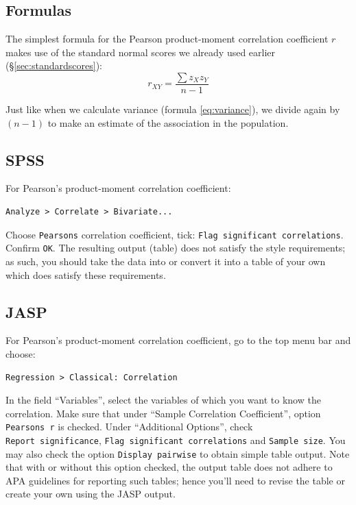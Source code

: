 \documentclass[
]{book}
\begin{document}
\hypertarget{formulas-3}{%
\subsection{Formulas}\label{formulas-3}}

The simplest formula for the Pearson product-moment correlation coefficient
\(r\) makes use of the standard normal scores we already used earlier
(§\ref{sec:standardscores}):
\begin{equation}
    r_{XY} = \frac{\sum z_X z_Y}{n-1}
  \label{eq:pearson}
\end{equation}

Just like when we calculate variance
(formula \eqref{eq:variance}), we divide again by
\((n-1)\) to make an estimate of the association in the population.

\hypertarget{spss-5}{%
\subsection{SPSS}\label{spss-5}}

For Pearson's product-moment correlation coefficient:

\begin{verbatim}
Analyze > Correlate > Bivariate...
\end{verbatim}

Choose \texttt{Pearsons} correlation coefficient, tick:
\texttt{Flag\ significant\ correlations}. Confirm \texttt{OK}. The resulting
output (table) does not satisfy the style requirements; as such, you should
take the data into or convert it into a table of your own which does satisfy these requirements.

\hypertarget{jasp-6}{%
\subsection{JASP}\label{jasp-6}}

For Pearson's product-moment correlation coefficient, go to the top menu bar and choose:

\begin{verbatim}
Regression > Classical: Correlation
\end{verbatim}

In the field ``Variables'', select the variables of which you want to know the correlation.
Make sure that under ``Sample Correlation Coefficient'', option \texttt{Pearson\textquotesingle{}s\ r} is checked.
Under ``Additional Options'', check \texttt{Report\ significance}, \texttt{Flag\ significant\ correlations} and \texttt{Sample\ size}. You may also check the option \texttt{Display\ pairwise} to obtain simple table output.
Note that with or without this option checked, the output table does not adhere to APA guidelines for reporting such tables; hence you'll need to revise the table or create your own using the JASP output.
\end{document}
